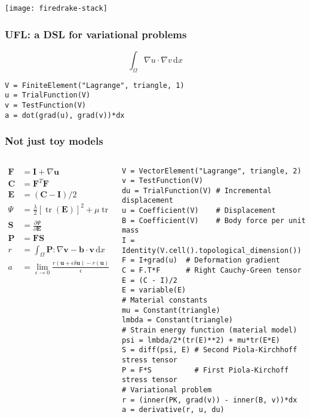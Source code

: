 \documentclass[presentation]{beamer}
\DeclareMathOperator{\tr}{tr}
\begin{document}
\begin{frame}
  \texttt{[image: firedrake-stack]}
\end{frame}

\begin{frame}[fragile]
  \frametitle{UFL: a DSL for variational problems}
  \begin{equation*}
    \int_\Omega \nabla u \cdot \nabla v\,\text{d}x
  \end{equation*}

\begin{verbatim}
V = FiniteElement("Lagrange", triangle, 1)
u = TrialFunction(V)
v = TestFunction(V)
a = dot(grad(u), grad(v))*dx
\end{verbatim}
\end{frame}

\begin{frame}[fragile]
  \frametitle{Not just toy models}
  \begin{columns}
    \begin{column}{0.4\textwidth}
      \begin{align*}
        \mathbf{F} &= \mathbf{I} + \nabla \mathbf{u}\\
        \mathbf{C} &= \mathbf{F}^T \mathbf{F}\\
        \mathbf{E} &= (\mathbf{C} - \mathbf{I}) / 2\\
        \Psi &= \frac{\lambda}{2}[\tr(\mathbf{E})]^2 + \mu \tr(\mathbf{E}^2)\\
        \mathbf{S} &= \frac{\partial \Psi}{\partial \mathbf{E}}\\
        \mathbf{P} &= \mathbf{F} \mathbf{S}\\
        r &= \int_\Omega \mathbf{P} : \nabla \mathbf{v} - \mathbf{b} \cdot \mathbf{v}\,\text{d}x\\
        a &= \lim_{\epsilon \to 0} \frac{r(\mathbf{u} + \epsilon \delta \mathbf{u}) - r(\mathbf{u})}{\epsilon}
      \end{align*}
    \end{column}
    \begin{column}{0.6\textwidth}
\begin{verbatim}
V = VectorElement("Lagrange", triangle, 2)
v = TestFunction(V)
du = TrialFunction(V) # Incremental displacement
u = Coefficient(V)    # Displacement
B = Coefficient(V)    # Body force per unit mass
I = Identity(V.cell().topological_dimension())
F = I+grad(u)  # Deformation gradient
C = F.T*F      # Right Cauchy-Green tensor
E = (C - I)/2
E = variable(E)
# Material constants
mu = Constant(triangle)
lmbda = Constant(triangle)
# Strain energy function (material model)
psi = lmbda/2*(tr(E)**2) + mu*tr(E*E)
S = diff(psi, E) # Second Piola-Kirchhoff stress tensor
P = F*S          # First Piola-Kirchoff stress tensor
# Variational problem
r = (inner(PK, grad(v)) - inner(B, v))*dx
a = derivative(r, u, du)
\end{verbatim}
    \end{column}
  \end{columns}  
\end{frame}
\end{document}
